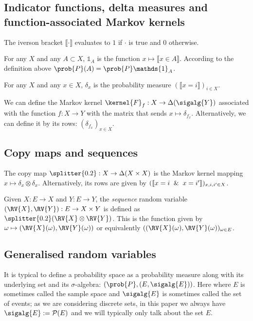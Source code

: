\subsection{Indicator functions, delta measures and function-associated Markov kernels}

The iverson bracket $\llbracket \cdot \rrbracket$ evaluates to $1$ if $\cdot$ is true and $0$ otherwise.

For any $X$ and any $A\subset X$, $\mathds{1}_A$ is the function $x\mapsto \llbracket x\in A \rrbracket$. According to the definition above $\prob{P}(A)=\prob{P}\mathds{1}_A$.

For any $X$ and any $x\in X$, $\delta_x$ is the probability measure $(\llbracket x=i \rrbracket)_{i\in X}$.

We can define the Markov kernel $\kernel{F}_f:X\to \Delta(\sigalg{Y})$ associated with the function $f:X\to Y$ with the matrix that sends $x\mapsto \delta_{f_x}$. Alternatively, we can define it by its rows: $(\delta_{f_x})_{x\in X}$.

\subsection{Copy maps and sequences}

The copy map $\splitter{0.2}:X\to \Delta(X\times X)$ is the Markov kernel mapping $x\mapsto \delta_x \otimes \delta_x$. Alternatively, its rows are given by $(\llbracket x=i \And x=i' \rrbracket)_{x,i,i'\in X}$. 

Given $X:E\to X$ and $Y:E\to Y$, the \emph{sequence} random variable $(\RV{X},\RV{Y}):E\to X\times Y$ is defined as $\splitter{0.2}(\RV{X}\otimes \RV{Y})$. This is the function given by $\omega \mapsto (\RV{X}(\omega),\RV{Y}(\omega))$ or equivalently $((\RV{X}(\omega),\RV{Y}(\omega))_{\omega\in E}$.

\subsection{Generalised random variables}

It is typical to define a probability space as a probability measure along with its underlying set and its $\sigma$-algebra: $(\prob{P},(E,\sigalg{E}))$. Here where $E$ is sometimes called the sample space and $\sigalg{E}$ is sometimes called the set of events; as we are considering discrete sets, in this paper we always have $\sigalg{E}:=\mathcal{P}(E)$ and we will typically only talk about the set $E$.

